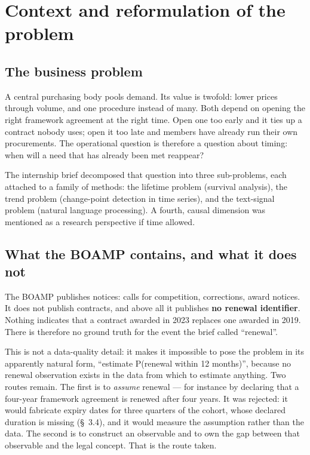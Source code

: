 \section{Context and reformulation of the problem}

\subsection{The business problem}

A central purchasing body pools demand. Its value is twofold: lower prices through volume, and one procedure instead of many. Both depend on opening the right framework agreement at the right time. Open one too early and it ties up a contract nobody uses; open it too late and members have already run their own procurements. The operational question is therefore a question about timing: when will a need that has already been met reappear?

The internship brief decomposed that question into three sub-problems, each attached to a family of methods: the lifetime problem (survival analysis), the trend problem (change-point detection in time series), and the text-signal problem (natural language processing). A fourth, causal dimension was mentioned as a research perspective if time allowed.

\subsection{What the BOAMP contains, and what it does not}

The BOAMP publishes notices: calls for competition, corrections, award notices. It does not publish contracts, and above all it publishes \textbf{no renewal identifier}. Nothing indicates that a contract awarded in 2023 replaces one awarded in 2019. There is therefore no ground truth for the event the brief called ``renewal''.

This is not a data-quality detail: it makes it impossible to pose the problem in its apparently natural form, ``estimate P(renewal within 12 months)'', because no renewal observation exists in the data from which to estimate anything. Two routes remain. The first is to \emph{assume} renewal --- for instance by declaring that a four-year framework agreement is renewed after four years. It was rejected: it would fabricate expiry dates for three quarters of the cohort, whose declared duration is missing (\S~3.4), and it would measure the assumption rather than the data. The second is to construct an observable and to own the gap between that observable and the legal concept. That is the route taken.

